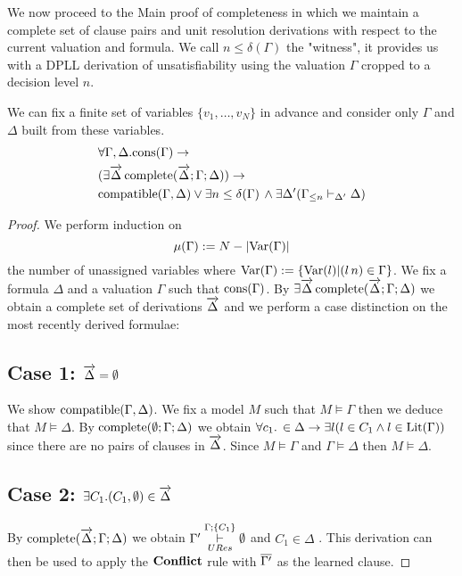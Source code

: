 We now proceed to the Main proof of completeness in which we maintain a complete set of clause pairs and unit resolution derivations with respect to the current valuation and formula. We call $n \leq \delta(\Gamma)$  the "witness", it provides us with a DPLL derivation of unsatisfiability using the valuation $\Gamma$ cropped to a decision level $n$.\\
\medskip
\begin{mytheorem} 
We can fix a finite set of variables $\{v_1, \ldots , v_N \}$ in advance and consider only $\Gamma$ and $\Delta$ built from these variables.
\begin{align*}
 &\forall \Gamma, \Delta. \mathrm{cons}(\Gamma) \to   \\ 
& (\exists \overrightarrow{\Delta} \, \mathrm{complete}(\overrightarrow{\Delta};\Gamma; \Delta)) \to \\
&\mathrm{compatible}(\Gamma,\Delta) \vee  \exists n \leq \delta(\Gamma) \, \wedge  \exists \Delta' ( \Gamma_{\leq n}  \vdash_{\Delta'} \Delta)
\end{align*}
%
\begin{proof}
We perform induction on  
$$\mu(\Gamma) := N - |\mathrm{Var}(\Gamma)|$$
the number of unassigned variables where $\mathrm{Var}(\Gamma) := \{\mathrm{Var}(l)| (l \, n) \in \Gamma \}$.
%
We fix a formula $\Delta$ and a valuation $\Gamma$ such that $\mathrm{cons}(\Gamma)$. By $\exists \overrightarrow{\Delta} \, \mathrm{complete}(\overrightarrow{\Delta};\Gamma; \Delta) $ we obtain a complete set of derivations $\overrightarrow{\Delta}$ and we perform a case distinction on the most recently derived formulae:

\subsection*{Case 1: $\overrightarrow{\Delta} = \emptyset$}
We show $\mathrm{compatible}(\Gamma,\Delta)$. We fix a model $M$ such that $M \models \Gamma$ then we  deduce that $M \models \Delta$. By $\mathrm{complete}(\emptyset;\Gamma; \Delta)$ we obtain $\forall c_1. \, \in \Delta \to \exists l( l \in C_1 \wedge l \in \mathrm{Lit}(\Gamma))$ since there are no pairs of clauses in $\overrightarrow{\Delta}$. Since $M \models \Gamma$ and $\Gamma \models \Delta$ then $M \models \Delta$.

\subsection*{Case 2: $\exists C_1. (C_1, \emptyset) \in \overrightarrow{\Delta}$}
By $\mathrm{complete}(\overrightarrow{\Delta};\Gamma; \Delta)$ we obtain $\Gamma' \overset{\Gamma;\{ C_1 \} }{\underset{URes}{\vdash}} \emptyset$ and $C_1 \in \Delta$ . This derivation can then be used to apply the $\mathbf{Conflict}$ rule with $\overline{\Gamma'}$ as the learned clause. 
%

\end{proof}
\end{mytheorem}
